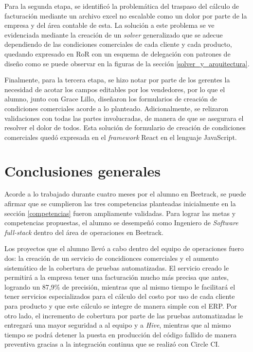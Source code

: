 \begin{enumerate}
    Para la segunda etapa, se identificó la problemática del traspaso del cálculo de facturación mediante un archivo excel no escalable como un dolor por parte de la empresa y del área contable de esta. La solución a este problema se ve evidenciada mediante la creación de un \textit{solver} generalizado que se adecue dependiendo de las condiciones comerciales de cada cliente y cada producto, quedando expresado en RoR con un esquema de delegación con patrones de diseño como se puede observar en la figuras de la sección \ref{solver_y_arquitectura}.

    Finalmente, para la tercera etapa, se hizo notar por parte de los gerentes la necesidad de acotar los campos editables por los vendedores, por lo que el alumno, junto con Grace Lillo, diseñaron los formularios de creación de condiciones comerciales acorde a lo planteado. Adicionalmente, se relizaron validaciones con todas las partes involucradas, de manera de que se asegurara el resolver el dolor de todos. Esta solución de formulario de creación de condiciones comerciales quedó expresada en el \textit{framework} React en el lenguaje JavaScript.

  \end{enumerate}

\section{Conclusiones generales}

  Acorde a lo trabajado durante cuatro meses por el alumno en Beetrack, se puede afirmar que se cumplieron las tres competencias planteadas inicialmente en la sección \ref{competencias} fueron ampliamente validadas. Para lograr las metas y competencias propuestas, el alumno se desempeñó como Ingeniero de \textit{Software full-stack} dentro del área de operaciones en Beetrack.
  
  Los proyectos que el alumno llevó a cabo dentro del equipo de operaciones fuero dos: la creación de un servicio de concidionces comerciales  y el aumento sistemático de la cobertura de pruebas automatizadas. El servicio creado le permitirá a la empresa tener una facturación mucho más precisa que antes, logrando un 87,9\% de precisión, mientras que al mismo tiempo le facilitará el tener servicios especializados para el cálculo del costo por uso de cada cliente para producto y que este cálculo se integre de manera simple con el ERP. Por otro lado, el incremento de cobertura por parte de las pruebas automatizadas le entregará una mayor seguridad a al equipo y a \textit{Hive}, mientras que al mismo tiempo se podrá detener la puesta en producción del código fallido de manera preventiva gracias a la integración continua que se realizó con Circle CI.

